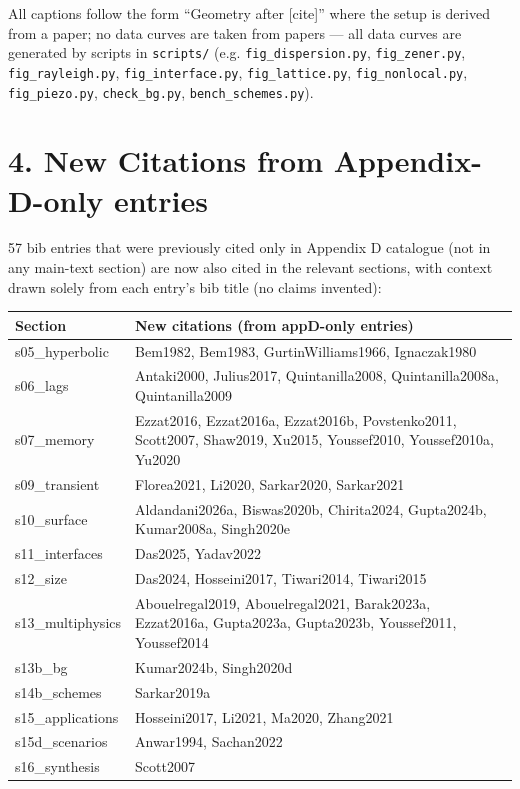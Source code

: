 \documentclass[12pt,a4paper]{article}
\begin{document}
All captions follow the form ``Geometry after [cite]'' where the setup is derived from a paper; no data curves are taken from papers --- all data curves are generated by scripts in {\tt scripts/} (e.g. {\tt fig\_dispersion.py}, {\tt fig\_zener.py}, {\tt fig\_rayleigh.py}, {\tt fig\_interface.py}, {\tt fig\_lattice.py}, {\tt fig\_nonlocal.py}, {\tt fig\_piezo.py}, {\tt check\_bg.py}, {\tt bench\_schemes.py}).

\section*{4. New Citations from Appendix-D-only entries}

57 bib entries that were previously cited only in Appendix D catalogue (not in any main-text section) are now also cited in the relevant sections, with context drawn solely from each entry's bib title (no claims invented):

\begin{tabularx}{\textwidth}{@{}lX@{}}\toprule
\textbf{Section} & \textbf{New citations (from appD-only entries)}\\\midrule
s05\_hyperbolic & Bem1982, Bem1983, GurtinWilliams1966, Ignaczak1980\\
s06\_lags & Antaki2000, Julius2017, Quintanilla2008, Quintanilla2008a, Quintanilla2009\\
s07\_memory & Ezzat2016, Ezzat2016a, Ezzat2016b, Povstenko2011, Scott2007, Shaw2019, Xu2015, Youssef2010, Youssef2010a, Yu2020\\
s09\_transient & Florea2021, Li2020, Sarkar2020, Sarkar2021\\
s10\_surface & Aldandani2026a, Biswas2020b, Chirita2024, Gupta2024b, Kumar2008a, Singh2020e\\
s11\_interfaces & Das2025, Yadav2022\\
s12\_size & Das2024, Hosseini2017, Tiwari2014, Tiwari2015\\
s13\_multiphysics & Abouelregal2019, Abouelregal2021, Barak2023a, Ezzat2016a, Gupta2023a, Gupta2023b, Youssef2011, Youssef2014\\
s13b\_bg & Kumar2024b, Singh2020d\\
s14b\_schemes & Sarkar2019a\\
s15\_applications & Hosseini2017, Li2021, Ma2020, Zhang2021\\
s15d\_scenarios & Anwar1994, Sachan2022\\
s16\_synthesis & Scott2007\\
\bottomrule
\end{tabularx}
\end{document}
